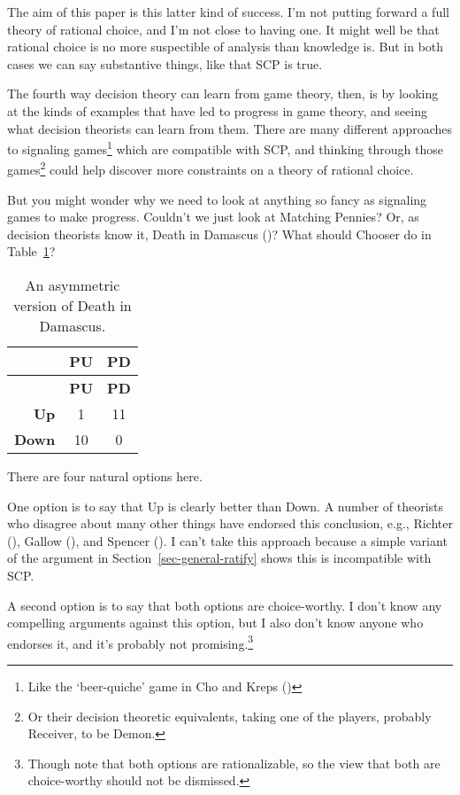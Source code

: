 \documentclass[
  11pt,
  letterpaper,
  DIV=11,
  numbers=noendperiod,
  twoside]{scrartcl}
\begin{document}
The aim of this paper is this latter kind of success. I'm not putting
forward a full theory of rational choice, and I'm not close to having
one. It might well be that rational choice is no more suspectible of
analysis than knowledge is. But in both cases we can say substantive
things, like that SCP is true.

The fourth way decision theory can learn from game theory, then, is by
looking at the kinds of examples that have led to progress in game
theory, and seeing what decision theorists can learn from them. There
are many different approaches to signaling games\footnote{Like the
  `beer-quiche' game in Cho and Kreps
  ()} which are compatible with SCP,
and thinking through those games\footnote{Or their decision theoretic
  equivalents, taking one of the players, probably Receiver, to be
  Demon.} could help discover more constraints on a theory of rational
choice.

But you might wonder why we need to look at anything so fancy as
signaling games to make progress. Couldn't we just look at Matching
Pennies? Or, as decision theorists know it, Death in Damascus
()? What should
Chooser do in Table~\ref{tbl-mean-demon}?

\begin{longtable}[]{@{}rcc@{}}
\caption{An asymmetric version of Death in
Damascus.}\label{tbl-mean-demon}\tabularnewline
\toprule\noalign{}
& \textbf{PU} & \textbf{PD} \\
\midrule\noalign{}
\endfirsthead
\toprule\noalign{}
& \textbf{PU} & \textbf{PD} \\
\midrule\noalign{}
\endhead
\bottomrule\noalign{}
\endlastfoot
\textbf{Up} & 1 & 11 \\
\textbf{Down} & 10 & 0 \\
\end{longtable}

There are four natural options here.

One option is to say that Up is clearly better than Down. A number of
theorists who disagree about many other things have endorsed this
conclusion, e.g., Richter (), Gallow
(), and Spencer
(). I can't take this approach because
a simple variant of the argument in Section~\ref{sec-general-ratify}
shows this is incompatible with SCP.

A second option is to say that both options are choice-worthy. I don't
know any compelling arguments against this option, but I also don't know
anyone who endorses it, and it's probably not promising.\footnote{Though
  note that both options are rationalizable, so the view that both are
  choice-worthy should not be dismissed.}
\end{document}
